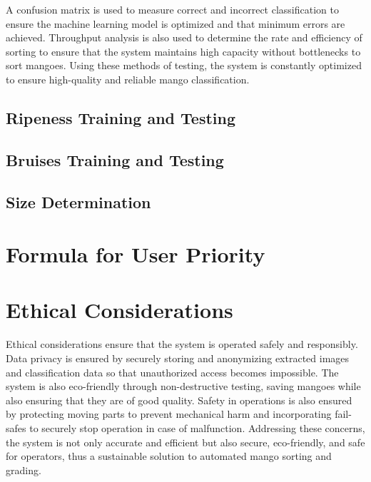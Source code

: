 A \gls{confusion matrix} is used to measure correct and incorrect classification to ensure the machine learning model 
is optimized and that minimum errors are achieved. 
Throughput analysis is also used to determine the rate and efficiency of sorting to 
ensure that the system maintains high capacity without bottlenecks to sort mangoes. 
Using these methods of testing, the system is constantly optimized to ensure high-quality and reliable mango classification.

\subsection{Ripeness Training and Testing} \label{sec:ripenesstraining}

\subsection{Bruises Training and Testing} \label{sec:bruisestraining}

\subsection{Size Determination} \label{sec:sizeDetermination}

\section{Formula for User Priority} \label{sec:formula}

\section{Ethical Considerations}
Ethical considerations ensure that the system is operated safely and responsibly. Data privacy is ensured by securely storing and anonymizing extracted images and classification data so that unauthorized access becomes impossible. The system is also eco-friendly through non-destructive testing, saving mangoes while also ensuring that they are of good quality. Safety in operations is also ensured by protecting moving parts to prevent mechanical harm and incorporating fail-safes to securely stop operation in case of malfunction. Addressing these concerns, the system is not only accurate and efficient but also secure, eco-friendly, and safe for operators, thus a sustainable solution to automated mango sorting and grading.





